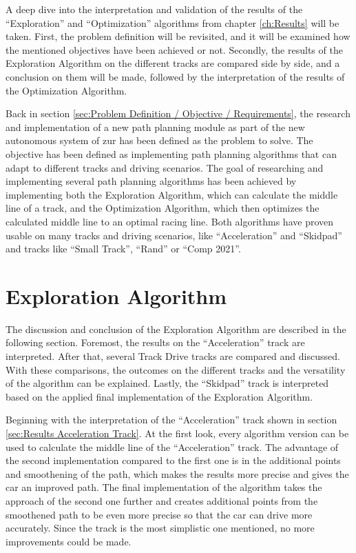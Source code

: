A deep dive into the interpretation and validation of the results of the ``Exploration'' and ``Optimization'' algorithms from chapter \ref{ch:Results} will be taken. First, the problem definition will be revisited, and it will be examined how the mentioned objectives have been achieved or not. Secondly, the results of the Exploration Algorithm on the different tracks are compared side by side, and a conclusion on them will be made, followed by the interpretation of the results of the Optimization Algorithm.

Back in section \ref{sec:Problem Definition / Objective / Requirements}, the research and implementation of a new path planning module as part of the new autonomous system of \acrlong{zur} has been defined as the problem to solve. The objective has been defined as implementing path planning algorithms that can adapt to different tracks and driving scenarios. The goal of researching and implementing several path planning algorithms has been achieved by implementing both the Exploration Algorithm, which can calculate the middle line of a track, and the Optimization Algorithm, which then optimizes the calculated middle line to an optimal racing line. Both algorithms have proven usable on many tracks and driving scenarios, like ``Acceleration'' and ``Skidpad'' and tracks like ``Small Track'', ``Rand'' or ``Comp 2021''.

\section{Exploration Algorithm}
The discussion and conclusion of the Exploration Algorithm are described in the following section. Foremost, the results on the ``Acceleration'' track are interpreted. After that, several Track Drive tracks are compared and discussed. With these comparisons, the outcomes on the different tracks and the versatility of the algorithm can be explained. Lastly, the ``Skidpad'' track is interpreted based on the applied final implementation of the Exploration Algorithm.

Beginning with the interpretation of the ``Acceleration'' track shown in section \ref{sec:Results Acceleration Track}. At the first look, every algorithm version can be used to calculate the middle line of the ``Acceleration'' track. The advantage of the second implementation compared to the first one is in the additional points and smoothening of the path, which makes the results more precise and gives the car an improved path. The final implementation of the algorithm takes the approach of the second one further and creates additional points from the smoothened path to be even more precise so that the car can drive more accurately. Since the track is the most simplistic one mentioned, no more improvements could be made.


